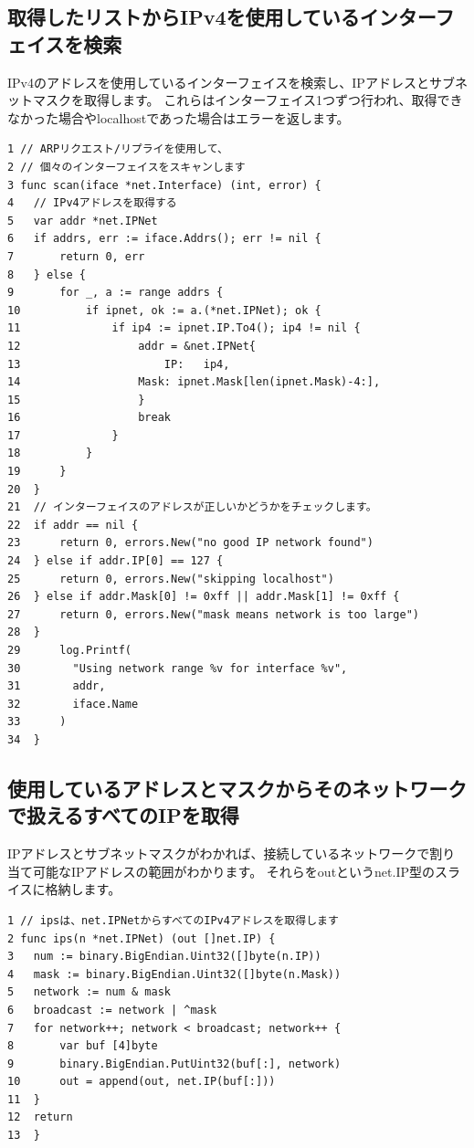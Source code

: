 \subsection{取得したリストからIPv4を使用しているインターフェイスを検索}
IPv4のアドレスを使用しているインターフェイスを検索し、IPアドレスとサブネットマスクを取得します。
これらはインターフェイス1つずつ行われ、取得できなかった場合やlocalhostであった場合はエラーを返します。
\begin{tcolorbox}[breakable]
    \begin{verbatim}
1 // ARPリクエスト/リプライを使用して、
2 // 個々のインターフェイスをスキャンします
3 func scan(iface *net.Interface) (int, error) {
4   // IPv4アドレスを取得する
5   var addr *net.IPNet
6   if addrs, err := iface.Addrs(); err != nil {
7       return 0, err
8   } else {
9       for _, a := range addrs {
10       	if ipnet, ok := a.(*net.IPNet); ok {
11			    if ip4 := ipnet.IP.To4(); ip4 != nil {
12                  addr = &net.IPNet{
13		    		    IP:   ip4,
14	        		Mask: ipnet.Mask[len(ipnet.Mask)-4:],
15	        		}
16		        	break
17		        }
18	        }
19	    }
20  }
21  // インターフェイスのアドレスが正しいかどうかをチェックします。
22 	if addr == nil {
23  	return 0, errors.New("no good IP network found")
24  } else if addr.IP[0] == 127 {
25		return 0, errors.New("skipping localhost")
26 	} else if addr.Mask[0] != 0xff || addr.Mask[1] != 0xff {
27  	return 0, errors.New("mask means network is too large")
28  }
29      log.Printf(
30        "Using network range %v for interface %v",
31        addr,
32        iface.Name
33      )
34  }
    \end{verbatim}
\end{tcolorbox}

\subsection{使用しているアドレスとマスクからそのネットワークで扱えるすべてのIPを取得}
IPアドレスとサブネットマスクがわかれば、接続しているネットワークで割り当て可能なIPアドレスの範囲がわかります。
それらをoutというnet.IP型のスライスに格納します。
\begin{tcolorbox}[breakable]
    \begin{verbatim}
1 // ipsは、net.IPNetからすべてのIPv4アドレスを取得します
2 func ips(n *net.IPNet) (out []net.IP) {
3   num := binary.BigEndian.Uint32([]byte(n.IP))
4   mask := binary.BigEndian.Uint32([]byte(n.Mask))
5   network := num & mask
6   broadcast := network | ^mask
7   for network++; network < broadcast; network++ {
8	    var buf [4]byte
9		binary.BigEndian.PutUint32(buf[:], network)
10      out = append(out, net.IP(buf[:]))
11  }
12  return
13  }
    \end{verbatim}
\end{tcolorbox}

